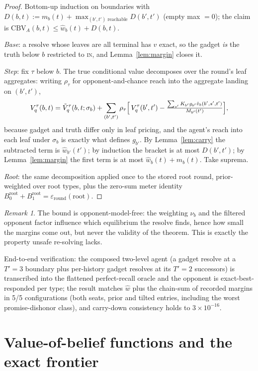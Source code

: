 \documentclass[11pt]{article}
\theoremstyle{plain}
\theoremstyle{definition}
\theoremstyle{remark}
\newtheorem{remark}[theorem]{Remark}
\newcommand{\CBV}{\mathrm{CBV}}
\begin{document}
\begin{proof}
Bottom-up induction on boundaries with
$D(b,t) := m_b(t) + \max_{(b',t')\text{ reachable}} D(b',t')$ (empty
max $=0$); the claim is $\CBV_A(b,t)\le\hat w_b(t)+D(b,t)$.

\emph{Base}: a resolve whose leaves are all terminal has $\hat v$
exact, so the gadget \emph{is} the truth below $b$ restricted to
\textsc{in}, and Lemma~\ref{lem:margin} closes it.

\emph{Step}: fix $\tau$ below $b$. The true conditional value
decomposes over the round's leaf aggregates: writing $\rho_\tau$ for
opponent-and-chance reach into the aggregate landing on $(b',t')$,
\[
V^{\tau}_q(b,t) = \tilde V^{\tau}_q(b,t;\sigma_b)
+ \sum_{(b',t')} \rho_\tau\Bigl[\,V^{\tau}_q(b',t')
- \tfrac{\sum_{s'}K_{b'}g_{b'}\hat v_b(b',s',t')}{M_{b'}(t')}\Bigr],
\]
because gadget and truth differ only in leaf pricing, and the agent's
reach into each leaf under $\sigma_b$ is exactly what defines
$g_{b'}$. By Lemma~\ref{lem:carry} the subtracted term is
$\hat w_{b'}(t')$; by induction the bracket is at most $D(b',t')$;
by Lemma~\ref{lem:margin} the first term is at most
$\hat w_b(t)+m_b(t)$. Take suprema.

\emph{Root}: the same decomposition applied once to the stored root
round, prior-weighted over root types, plus the zero-sum meter
identity $B^{\mathrm{root}}_0+B^{\mathrm{root}}_1 =
\varepsilon_{\mathrm{round}}(\mathrm{root})$.
\end{proof}

\begin{remark}
The bound is opponent-model-free: the weighting $\nu_b$ and the
filtered opponent factor influence which equilibrium the resolve
finds, hence how small the margins come out, but never the validity of
the theorem. This is exactly the property unsafe re-solving lacks.
\end{remark}

End-to-end verification: the composed two-level agent (a gadget
resolve at a $T'{=}3$ boundary plus per-history gadget resolves at its
$T'{=}2$ successors) is transcribed into the flattened perfect-recall
oracle and the opponent is exact-best-responded per type; the result
matches $\hat w$ plus the chain-sum of recorded margins in 5/5
configurations (both seats, prior and tilted entries, including the
worst promise-dishonor class), and carry-down consistency holds to
$3\times10^{-16}$.

\section{Value-of-belief functions and the exact frontier}
\label{sec:frontier}
\end{document}
